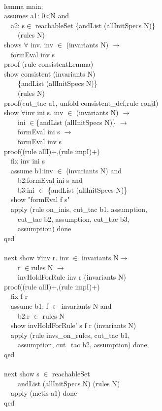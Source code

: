 \begin{specification}
\\
lemma main:\\
assumes  a1: 0<N and \\
~~a2: s$\in$ reachableSet \{andList (allInitSpecs N)\}\\
~~~~(rules N)\\
shows $\forall$ inv. inv $\in$ (invariants N) $\longrightarrow$\\
~~formEval inv s\\
proof (rule consistentLemma)\\
show consistent (invariants N)\\
~~~~\{andList (allInitSpecs N)\}\\
~~~~(rules N)\\
proof(cut\_tac a1, unfold consistent\_def,rule conjI)\\
show  $\forall$inv ini s. inv $\in$ (invariants N) $\longrightarrow$\\
~~~~ini $\in$\{andList (allInitSpecs N)\} $\longrightarrow$\\
~~~~formEval ini s $\longrightarrow$ \\
~~~~formEval inv s\\
proof((rule allI)+,(rule impI)+)\\
~~fix inv ini s\\
~~assume b1:inv $\in$ (invariants N) and\\
~~~~b2:formEval ini s and \\
~~~~b3:ini $\in$ \{andList (allInitSpecs N)\}  \\
~~show "formEval f s"\\
~~apply (rule on\_inis, cut\_tac b1, assumption,\\
~~~~cut\_tac b2, assumption, cut\_tac b3, \\
~~~~assumption) done\\
qed\\ \\

next   show  $\forall$inv r. inv $\in$ invariants N$\longrightarrow$ \\
~~~~r $\in$rules N $\longrightarrow$ \\
~~~~invHoldForRule inv r (invariants N) \\
proof((rule allI)+,(rule impI)+)\\
~~fix f r \\
~~assume b1: f $\in$ invariants N  and \\
~~~~b2:r $\in$ rules N\\
~~show invHoldForRule' s f r (invariants N)\\
~~apply (rule invs\_on\_rules, cut\_tac b1,\\
~~~~assumption, cut\_tac b2, assumption) done\\
qed\\ \\

next show s $\in$ reachableSet \\
~~~~andList (allInitSpecs N) (rules N)\\
~~apply (metis a1) done\\
qed\\
\end{specification}


